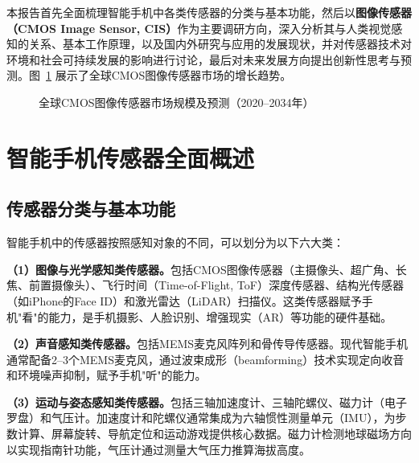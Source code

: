 \documentclass[12pt, a4paper]{ctexart}
\begin{document}
本报告首先全面梳理智能手机中各类传感器的分类与基本功能，然后以\textbf{图像传感器（CMOS Image Sensor, CIS）}作为主要调研方向，深入分析其与人类视觉感知的关系、基本工作原理，以及国内外研究与应用的发展现状，并对传感器技术对环境和社会可持续发展的影响进行讨论，最后对未来发展方向提出创新性思考与预测。图~\ref{fig:market_growth} 展示了全球CMOS图像传感器市场的增长趋势。

\begin{figure}[H]
\centering
{}
\caption{全球CMOS图像传感器市场规模及预测（2020--2034年）\cite{statsmarket2026}}
\label{fig:market_growth}
\end{figure}


\section{智能手机传感器全面概述}

\subsection{传感器分类与基本功能}

智能手机中的传感器按照感知对象的不同，可以划分为以下六大类：

\textbf{（1）图像与光学感知类传感器。}包括CMOS图像传感器（主摄像头、超广角、长焦、前置摄像头）、飞行时间（Time-of-Flight, ToF）深度传感器、结构光传感器（如iPhone的Face ID）和激光雷达（LiDAR）扫描仪。这类传感器赋予手机"看"的能力，是手机摄影、人脸识别、增强现实（AR）等功能的硬件基础。

\textbf{（2）声音感知类传感器。}包括MEMS麦克风阵列和骨传导传感器。现代智能手机通常配备2--3个MEMS麦克风，通过波束成形（beamforming）技术实现定向收音和环境噪声抑制，赋予手机"听"的能力。

\textbf{（3）运动与姿态感知类传感器。}包括三轴加速度计、三轴陀螺仪、磁力计（电子罗盘）和气压计。加速度计和陀螺仪通常集成为六轴惯性测量单元（IMU），为步数计算、屏幕旋转、导航定位和运动游戏提供核心数据。磁力计检测地球磁场方向以实现指南针功能，气压计通过测量大气压力推算海拔高度。
\end{document}
